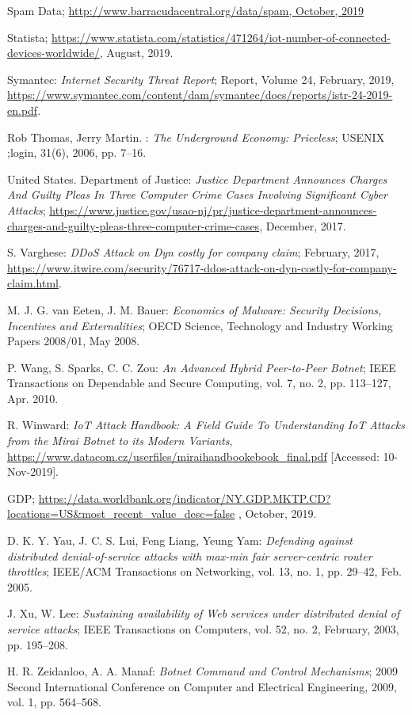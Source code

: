 \begin{thebibliography}{99}
 Spam Data; \url{http://www.barracudacentral.org/data/spam, October, 2019} %

 Statista; \url{https://www.statista.com/statistics/471264/iot-number-of-connected-devices-worldwide/}, August, 2019.

 Symantec: \emph{Internet Security Threat Report}; Report, Volume 24, February, 2019, \url{https://www.symantec.com/content/dam/symantec/docs/reports/istr-24-2019-en.pdf}.

 Rob Thomas, Jerry Martin. : \emph{The Underground Economy: Priceless}; USENIX ;login, 31(6), 2006, pp. 7--16.

 United States. Department of Justice: \emph{Justice Department Announces Charges And Guilty Pleas In Three Computer Crime Cases Involving Significant Cyber Attacks}; \url{https://www.justice.gov/usao-nj/pr/justice-department-announces-charges-and-guilty-pleas-three-computer-crime-cases}, December, 2017.

 S. Varghese: \emph{DDoS Attack on Dyn costly for company claim}; February, 2017, \url{https://www.itwire.com/security/76717-ddos-attack-on-dyn-costly-for-company-claim.html}.

 M. J. G. van Eeten, J. M. Bauer: \emph{Economics of Malware: Security Decisions, Incentives and Externalities}; OECD Science, Technology and Industry Working Papers 2008/01, May 2008.

 P. Wang, S. Sparks, C. C. Zou: \emph{An Advanced Hybrid Peer-to-Peer Botnet}; IEEE Transactions on Dependable and Secure Computing, vol. 7, no. 2, pp. 113--127, Apr. 2010.

 R. Winward: \emph{IoT Attack Handbook: A Field Guide To Understanding IoT Attacks from the Mirai Botnet to its Modern Variants}, \url{https://www.datacom.cz/userfiles/miraihandbookebook_final.pdf} [Accessed: 10-Nov-2019].

 GDP; \url{https://data.worldbank.org/indicator/NY.GDP.MKTP.CD?locations=US&most_recent_value_desc=false} , October, 2019.

 D. K. Y. Yau, J. C. S. Lui, Feng Liang, Yeung Yam: \emph{Defending against distributed denial-of-service attacks with max-min fair server-centric router throttles}; IEEE/ACM Transactions on Networking, vol. 13, no. 1, pp. 29--42, Feb. 2005.

 J. Xu, W. Lee: \emph{Sustaining availability of Web services under distributed denial of service attacks}; IEEE Transactions on Computers, vol. 52, no. 2, February, 2003, pp. 195--208.

 H. R. Zeidanloo, A. A. Manaf: \emph{Botnet Command and Control Mechanisms}; 2009 Second International Conference on Computer and Electrical Engineering, 2009, vol. 1, pp. 564--568.

\end{thebibliography}



